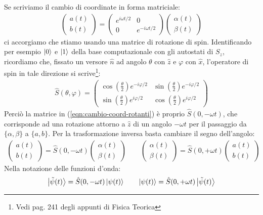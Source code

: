 \documentclass[../../InformazioneQuantistica.tex]{subfiles}
\begin{document}
\begin{enumerate}
Se scriviamo il cambio di coordinate in forma matriciale:
\begin{align}
\begin{pmatrix}a(t) \\ b(t)\end{pmatrix} = \begin{pmatrix} e^{i\omega t/2} & 0 \\ 0 & e^{-i\omega t/2}\end{pmatrix}
\begin{pmatrix}
\alpha(t)\\\beta(t)
\end{pmatrix}
\label{eqn:cambio-coord-rotanti}
\end{align}
ci accorgiamo che stiamo usando una matrice di rotazione di spin. Identificando per esempio $\Ket{0}$ e $\Ket{1}$ della base computazionale con gli autostati di $S_z$, ricordiamo che, fissato un versore $\hat{n}$ ad angolo $\theta$ con $\hat{z}$ e $\varphi$ con $\hat{x}$, l'operatore di spin in tale direzione si scrive\footnote{Vedi pag. 241 degli appunti di Fisica Teorica}:
\begin{align*}
\hat{S}(\theta,\varphi) = \begin{pmatrix}
 \cos\left(\frac{\theta}{2}\right)e^{-i\varphi/2} & \sin\left(\frac{\theta}{2}\right) e^{-i\varphi/2}\\
\sin\left(\frac{\theta}{2}\right) e^{i\varphi/2} & \cos\left(\frac{\theta}{2}\right) e^{i\varphi/2}
\end{pmatrix}
\end{align*} 
Perciò la matrice in (\ref{eqn:cambio-coord-rotanti}) è proprio $\hat{S}(0,-\omega t)$, 
che corrisponde ad una rotazione attorno a $\hat{z}$ di un angolo $-\omega t$ per il passaggio da $\{\alpha, \beta\}$ a $\{a,b\}$. Per la trasformazione inversa basta cambiare il segno dell'angolo:
\begin{align*}
\begin{pmatrix}a(t)\\ b(t)\end{pmatrix}= \hat{S}(0,-\omega t ) \begin{pmatrix}\alpha(t)\\\beta(t)\end{pmatrix} \qquad \begin{pmatrix} \alpha(t) \\ \beta(t)\end{pmatrix} = \hat{S}(0,+\omega t) \begin{pmatrix}a(t) \\ b(t) \end{pmatrix}
\end{align*}
Nella notazione delle funzioni d'onda:
\begin{align*}
\Ket{\tilde{\psi}(t)} = \hat{S}(0,-\omega t) \Ket{\psi(t)} \qquad \Ket{\psi(t)}=\hat{S}(0,+\omega t) \Ket{\tilde{\psi}(t)}
\end{align*}


\end{enumerate}
\end{document}
